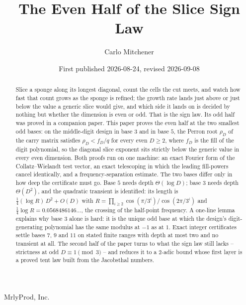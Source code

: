 \documentclass[11pt]{amsart}
\title{The Even Half of the Slice Sign Law}
\author{Carlo Mitchener}
\date{First published 2026-08-24, revised 2026-09-08}
\theoremstyle{definition}
\theoremstyle{remark}
\begin{document}
\begin{abstract}
Slice a sponge along its longest diagonal, count the cells the cut meets, and watch how fast that count grows as the sponge is refined; the growth rate lands just above or just below the value a generic slice would give, and which side it lands on is decided by nothing but whether the dimension is even or odd. That is the sign law. Its odd half was proved in a companion paper. This paper proves the even half at the two smallest odd bases: on the middle-digit design in base $3$ and in base $5$, the Perron root $\rho_D$ of the carry matrix satisfies $\rho_D < f_D/q$ for every even $D \ge 2$, where $f_D$ is the fill of the digit polynomial, so the diagonal slice exponent sits strictly below the generic value in every even dimension. Both proofs run on one machine: an exact Fourier form of the Collatz--Wielandt test vector, an exact telescoping in which the leading fill-powers cancel identically, and a frequency-separation estimate. The two bases differ only in how deep the certificate must go. Base $5$ needs depth $\Theta(\log D)$; base $3$ needs depth $\Theta(D^2)$, and the quadratic transient is identified: its length is $\tfrac14 (\log R)\, D^2 + O(D)$ with $R = \prod_{i \ge 2} \cos(\pi/3^i)/\cos(2\pi/3^i)$ and $\tfrac14\log R = 0.0568486146\ldots$, the crossing of the half-point frequency. A one-line lemma explains why base $3$ alone is hard: it is the unique odd base at which the design's digit-generating polynomial has the same modulus at $-1$ as at $1$. Exact integer certificates settle bases $7$, $9$ and $11$ on stated finite ranges with depth at most two and no transient at all. The second half of the paper turns to what the sign law still lacks -- strictness at odd $D \equiv 1 \pmod 3$ -- and reduces it to a $2$-adic bound whose first layer is a proved tent law built from the Jacobsthal numbers.
\end{abstract}

\makeatletter
\global\let\titledate\@date
\global\let\paperabstract\@setabstracta
\global\let\@date\@empty
\global\let\@setabstract\relax
\makeatother

\maketitle

\begin{center}
\normalfont\footnotesize
MrlyProd, Inc.\\
\titledate
\end{center}
\end{document}
